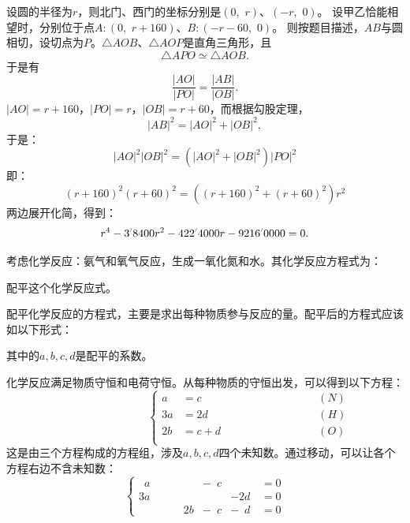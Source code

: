 \documentclass[12pt,UTF8,fontset=none]{ctexbook}
\begin{document}
设圆的半径为$r$，则北门、西门的坐标分别是$(0, \,\, r)$、$(-r, \,\, 0)$。
设甲乙恰能相望时，分别位于点$A:(0, \,\, r+160)$、$B:(-r-60, \,\, 0)$。
则按题目描述，$AB$与圆相切，设切点为$P$。$\triangle AOB$、$\triangle AOP$是直角三角形，且
$$ \triangle APO \simeq \triangle AOB.$$
于是有
$$ \frac{|AO|}{|PO|} = \frac{|AB|}{|OB|}.$$
$|AO| = r+160$，$|PO| = r$，$|OB| = r + 60$，而根据勾股定理，
$$ |AB|^2 = |AO|^2 + |OB|^2,$$
于是：
$$ |AO|^2 |OB|^2 = \left(|AO|^2 + |OB|^2\right) |PO|^2 $$
即：
$$ (r+160)^2 (r+60)^2 = \left((r+160)^2 + (r+60)^2\right) r^2 $$
两边展开化简，得到：
$$ r^4 - 3\dlim{8400} r^2 - 422\dlim{4000} r - 9216\dlim{0000} = 0. $$

\begin{ex}
  考虑化学反应：氨气和氧气反应，生成一氧化氮和水。其化学反应方程式为：

\begin{center}
\end{center}

  配平这个化学反应式。
\end{ex}

配平化学反应的方程式，主要是求出每种物质参与反应的量。配平后的方程式应该如以下形式：

\begin{center}
\end{center}

其中的$a, b, c, d$是配平的系数。

化学反应满足物质守恒和电荷守恒。从每种物质的守恒出发，可以得到以下方程：
$$ \qquad \qquad \qquad \qquad \left\{
    \begin{array}{rll}
a &= c &\qquad \qquad \qquad \qquad (N) \\
3a &= 2d &\qquad \qquad \qquad \qquad (H) \\
2b &= c + d &\qquad \qquad \qquad \qquad (O) \\
\end{array}
\right. 
$$
这是由三个方程构成的方程组，涉及$a, b, c, d$四个未知数。通过移动，可以让各个方程右边不含未知数：
$$\left\{
    \begin{array}{rrrrl}
\phantom{0}a &\phantom{+ 0b} &- \phantom{0}c &\phantom{+ 0b}\, &= 0  \\
3a &\phantom{+ 0b} &\phantom{- 0c} &- 2d\, &= 0  \\
\phantom{0a} &\phantom{+ }\quad 2b &- \phantom{0}c &- \phantom{0}d\, &= 0  
\end{array}
\right. 
$$
\end{document}
